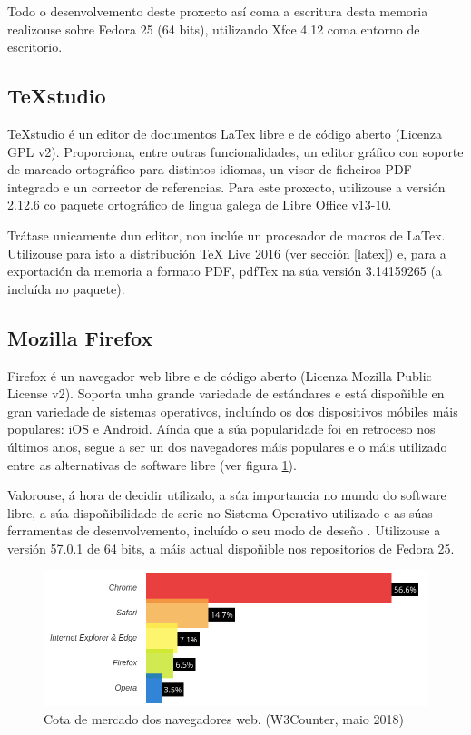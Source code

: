 Todo o desenvolvemento deste proxecto así coma a escritura desta memoria realizouse sobre Fedora 25 (64 bits), utilizando Xfce 4.12 coma entorno de escritorio.


\subsection{TeXstudio}

TeXstudio é un editor de documentos LaTex libre e de código aberto (Licenza GPL v2\cite{texstudio}). Proporciona, entre outras funcionalidades, un editor gráfico con soporte de marcado ortográfico para distintos idiomas, un visor de ficheiros PDF integrado e un corrector de referencias. Para este proxecto, utilizouse a versión 2.12.6 co paquete ortográfico de lingua galega de Libre Office v13-10.

Trátase unicamente dun editor, non inclúe un procesador de macros de LaTex. Utilizouse para isto a distribución TeX Live 2016 (ver sección \ref{latex}) e, para a exportación da memoria a formato PDF, pdfTex na súa versión 3.14159265 (a incluída no paquete).

\subsection{Mozilla Firefox}

Firefox é un navegador web libre e de código aberto (Licenza Mozilla Public License v2\cite{firefox}). Soporta unha grande variedade de estándares e está dispoñible en gran variedade de sistemas operativos, incluíndo os dos dispositivos móbiles máis populares: iOS e Android. Aínda que a súa popularidade foi en retroceso nos últimos anos, segue a ser un dos navegadores máis populares e o máis utilizado entre as alternativas de software libre (ver figura \ref{fig:firefox}).

Valorouse, á hora de decidir utilizalo, a súa importancia no mundo do software libre, a súa dispoñibilidade de serie no Sistema Operativo utilizado e as súas ferramentas de desenvolvemento, incluído o seu modo de deseño . Utilizouse a versión 57.0.1 de 64 bits, a máis actual dispoñible nos repositorios de Fedora 25.  

\begin{figure}[h]
	\centering
	\includegraphics[scale=0.5,keepaspectratio=true]{./images/firefox.png}
	\caption{Cota de mercado dos navegadores web. (W3Counter, maio 2018)\cite{firefox2}}
	\label{fig:firefox}
\end{figure}



